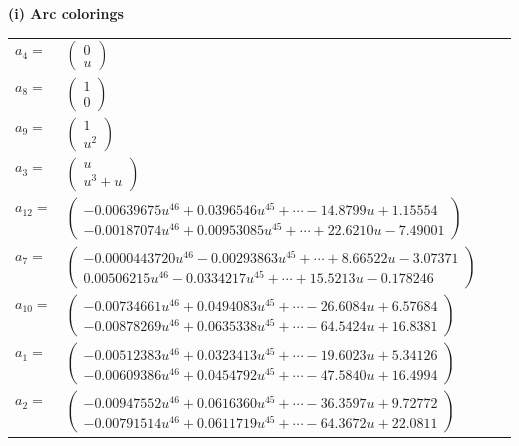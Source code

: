 \documentclass[1p]{elsarticle_modified}
\theoremstyle{definition}
\begin{document}
\flushleft \textbf{(i) Arc colorings}\\
\begin{tabular}{m{7pt} m{180pt} m{7pt} m{180pt} }
\flushright $a_{4}=$&$\begin{pmatrix}0\\u\end{pmatrix}$ \\
\flushright $a_{8}=$&$\begin{pmatrix}1\\0\end{pmatrix}$ \\
\flushright $a_{9}=$&$\begin{pmatrix}1\\u^2\end{pmatrix}$ \\
\flushright $a_{3}=$&$\begin{pmatrix}u\\u^3+u\end{pmatrix}$ \\
\flushright $a_{12}=$&$\begin{pmatrix}-0.00639675 u^{46}+0.0396546 u^{45}+\cdots-14.8799 u+1.15554\\-0.00187074 u^{46}+0.00953085 u^{45}+\cdots+22.6210 u-7.49001\end{pmatrix}$ \\
\flushright $a_{7}=$&$\begin{pmatrix}-0.0000443720 u^{46}-0.00293863 u^{45}+\cdots+8.66522 u-3.07371\\0.00506215 u^{46}-0.0334217 u^{45}+\cdots+15.5213 u-0.178246\end{pmatrix}$ \\
\flushright $a_{10}=$&$\begin{pmatrix}-0.00734661 u^{46}+0.0494083 u^{45}+\cdots-26.6084 u+6.57684\\-0.00878269 u^{46}+0.0635338 u^{45}+\cdots-64.5424 u+16.8381\end{pmatrix}$ \\
\flushright $a_{1}=$&$\begin{pmatrix}-0.00512383 u^{46}+0.0323413 u^{45}+\cdots-19.6023 u+5.34126\\-0.00609386 u^{46}+0.0454792 u^{45}+\cdots-47.5840 u+16.4994\end{pmatrix}$ \\
\flushright $a_{2}=$&$\begin{pmatrix}-0.00947552 u^{46}+0.0616360 u^{45}+\cdots-36.3597 u+9.72772\\-0.00791514 u^{46}+0.0611719 u^{45}+\cdots-64.3672 u+22.0811\end{pmatrix}$ \\

\end{tabular}
\end{document}
